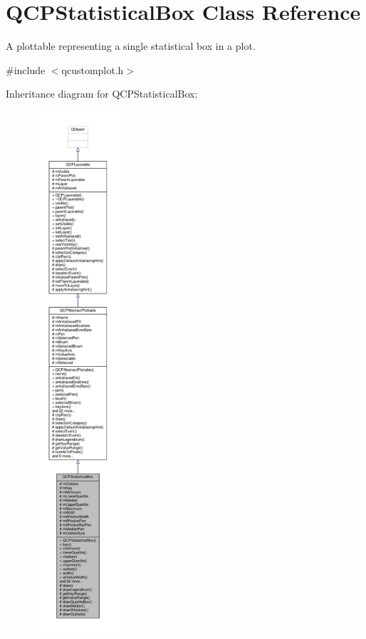 \hypertarget{class_q_c_p_statistical_box}{}\section{Q\+C\+P\+Statistical\+Box Class Reference}
\label{class_q_c_p_statistical_box}


A plottable representing a single statistical box in a plot.  




{\ttfamily \#include $<$qcustomplot.\+h$>$}



Inheritance diagram for Q\+C\+P\+Statistical\+Box\+:\nopagebreak
\begin{figure}[H]
\begin{center}
\leavevmode
\includegraphics[height=550pt]{class_q_c_p_statistical_box__inherit__graph}
\end{center}
\end{figure}


